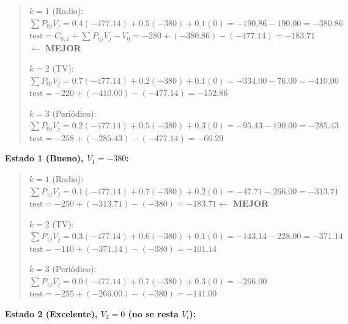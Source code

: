 \documentclass[12pt,a4paper]{article}
\begin{document}
\begin{quote}\footnotesize
$k=1$ (Radio):\;
$\sum P_{0j}V_j = 0.4(-477.14) + 0.5(-380) + 0.1(0) = -190.86 - 190.00 = -380.86$ \\
\hspace*{1.8cm} $\text{test} = C_{0,1} + \sum P_{0j}V_j - V_0 = -280 + (-380.86) - (-477.14) = \mathbf{-183.71}$\quad $\leftarrow$ \textbf{MEJOR}

\vspace{4pt}
$k=2$ (TV):\;
$\sum P_{0j}V_j = 0.7(-477.14) + 0.2(-380) + 0.1(0) = -334.00 - 76.00 = -410.00$ \\
\hspace*{1.8cm} $\text{test} = -220 + (-410.00) - (-477.14) = -152.86$

\vspace{4pt}
$k=3$ (Periódico):\;
$\sum P_{0j}V_j = 0.2(-477.14) + 0.5(-380) + 0.3(0) = -95.43 - 190.00 = -285.43$ \\
\hspace*{1.8cm} $\text{test} = -258 + (-285.43) - (-477.14) = -66.29$
\end{quote}

\vspace{0.3cm}
\textbf{Estado 1 (Bueno), $V_1 = -380$:}

\begin{quote}\footnotesize
$k=1$ (Radio):\;
$\sum P_{1j}V_j = 0.1(-477.14) + 0.7(-380) + 0.2(0) = -47.71 - 266.00 = -313.71$ \\
\hspace*{1.8cm} $\text{test} = -250 + (-313.71) - (-380) = \mathbf{-183.71}$\quad $\leftarrow$ \textbf{MEJOR}

\vspace{4pt}
$k=2$ (TV):\;
$\sum P_{1j}V_j = 0.3(-477.14) + 0.6(-380) + 0.1(0) = -143.14 - 228.00 = -371.14$ \\
\hspace*{1.8cm} $\text{test} = -110 + (-371.14) - (-380) = -101.14$

\vspace{4pt}
$k=3$ (Periódico):\;
$\sum P_{1j}V_j = 0.0(-477.14) + 0.7(-380) + 0.3(0) = -266.00$ \\
\hspace*{1.8cm} $\text{test} = -255 + (-266.00) - (-380) = -141.00$
\end{quote}

\vspace{0.3cm}
\textbf{Estado 2 (Excelente), $V_2 = 0$ (no se resta $V_i$):}
\end{document}
